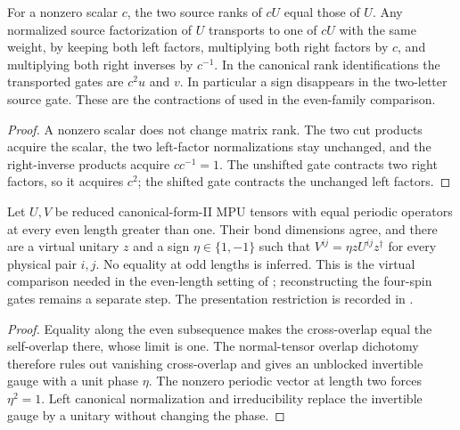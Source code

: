 \begin{lemma}
    \label{lem:mpu_source_factors_scalar_transport}
    \leanok
    For a nonzero scalar $c$, the two source ranks of $cU$ equal those of $U$.
    Any normalized source factorization of $U$ transports to one of $cU$
    with the same weight, by keeping both left factors, multiplying both
    right factors by $c$, and multiplying both right inverses by $c^{-1}$.
    In the canonical rank identifications the transported gates are $c^2u$
    and $v$. In particular a sign disappears in the two-letter source gate.
    These are the contractions of
    \cite[lines~479--524]{Cirac2017MPU} used in the even-family comparison.
\end{lemma}

\begin{proof}\leanok
    A nonzero scalar does not change matrix rank. The two cut products acquire
    the scalar, the two left-factor normalizations stay unchanged, and the
    right-inverse products acquire $cc^{-1}=1$. The unshifted gate contracts
    two right factors, so it acquires $c^2$; the shifted gate contracts the
    unchanged left factors.
\end{proof}

\begin{lemma}
    \label{lem:mpu_even_family_virtual_sign_gauge}
    \leanok
    Let $U,V$ be reduced canonical-form-II MPU tensors with equal periodic
    operators at every even length greater than one. Their bond dimensions
    agree, and there are a virtual unitary $z$ and a sign $\eta\in\{1,-1\}$
    such that $V^{ij}=\eta zU^{ij}z^\dagger$ for every physical pair $i,j$.
    No equality at odd lengths is inferred. This is the virtual comparison
    needed in the even-length setting of
    \cite[lines~1209--1252]{Cirac2017MPU}; reconstructing the four-spin
    gates remains a separate step. The presentation restriction is recorded
    in \cite{gap:mpu_canonical_form_full_support}.
\end{lemma}

\begin{proof}\leanok
    Equality along the even subsequence makes the cross-overlap equal the
    self-overlap there, whose limit is one. The normal-tensor overlap
    dichotomy therefore rules out vanishing cross-overlap and gives an
    unblocked invertible gauge with a unit phase $\eta$. The nonzero periodic
    vector at length two forces $\eta^2=1$. Left canonical normalization and
    irreducibility replace the invertible gauge by a unitary without changing
    the phase.
\end{proof}

